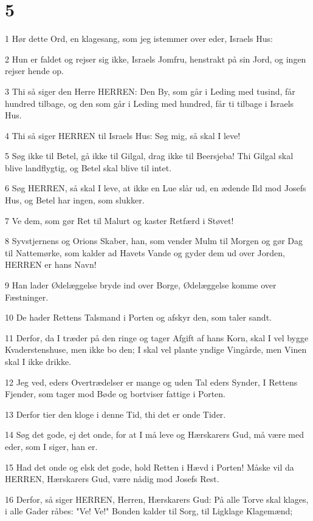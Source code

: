 \chapter{5}

\par 1 Hør dette Ord, en klagesang, som jeg istemmer over eder, Israels Hus:
\par 2 Hun er faldet og rejser sig ikke, Israels Jomfru, henstrakt på sin Jord, og ingen rejser hende op.
\par 3 Thi så siger den Herre HERREN: Den By, som går i Leding med tusind, får hundred tilbage, og den som går i Leding med hundred, får ti tilbage i Israels Hus.
\par 4 Thi så siger HERREN til Israels Hus: Søg mig, så skal I leve!
\par 5 Søg ikke til Betel, gå ikke til Gilgal, drag ikke til Beersjeba! Thi Gilgal skal blive landflygtig, og Betel skal blive til intet.
\par 6 Søg HERREN, så skal I leve, at ikke en Lue slår ud, en ædende Ild mod Josefs Hus, og Betel har ingen, som slukker.
\par 7 Ve dem, som gør Ret til Malurt og kaster Retfærd i Støvet!
\par 8 Syvstjernens og Orions Skaber, han, som vender Mulm til Morgen og gør Dag til Nattemørke, som kalder ad Havets Vande og gyder dem ud over Jorden, HERREN er hans Navn!
\par 9 Han lader Ødelæggelse bryde ind over Borge, Ødelæggelse komme over Fæstninger.
\par 10 De hader Rettens Talsmand i Porten og afskyr den, som taler sandt.
\par 11 Derfor, da I træder på den ringe og tager Afgift af hans Korn, skal I vel bygge Kvaderstenshuse, men ikke bo den; I skal vel plante yndige Vingårde, men Vinen skal I ikke drikke.
\par 12 Jeg ved, eders Overtrædelser er mange og uden Tal eders Synder, I Rettens Fjender, som tager mod Bøde og bortviser fattige i Porten.
\par 13 Derfor tier den kloge i denne Tid, thi det er onde Tider.
\par 14 Søg det gode, ej det onde, for at I må leve og Hærskarers Gud, må være med eder, som I siger, han er.
\par 15 Had det onde og elsk det gode, hold Retten i Hævd i Porten! Måske vil da HERREN, Hærskarers Gud, være nådig mod Josefs Rest.
\par 16 Derfor, så siger HERREN, Herren, Hærskarers Gud: På alle Torve skal klages, i alle Gader råbes: "Ve! Ve!" Bonden kalder til Sorg, til Ligklage Klagemænd;
